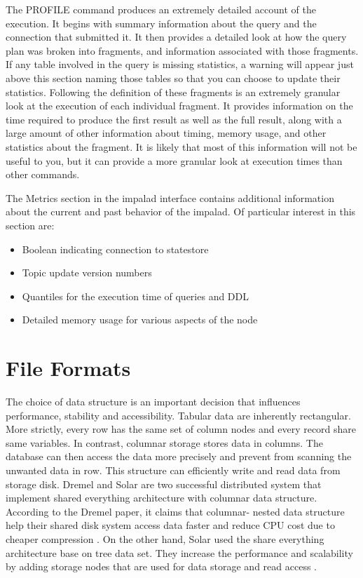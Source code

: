 \documentclass[onecolumn, draftclsnofoot,10pt, compsoc]{IEEEtran}
\begin{document}
The PROFILE command produces an extremely detailed account of the execution.
It begins with summary information about the query and the connection that submitted it.
It then provides a detailed look at how the query plan was broken into fragments, and information associated with those fragments.
If any table involved in the query is missing statistics, a warning will appear just above this section naming those tables so that you can choose to update their statistics.
Following the definition of these fragments is an extremely granular look at the execution of each individual fragment. 
It provides information on the time required to produce the first result as well as the full result, along with a large amount of other information about timing, memory usage, and other statistics about the fragment.
It is likely that most of this information will not be useful to you, but it can provide a more granular look at execution times than other commands. 

The Metrics section in the impalad interface contains additional information about the current and past behavior of the impalad. Of particular interest in this section are: 

\begin{itemize}
    \item Boolean indicating connection to statestore
    \item Topic update version numbers
    \item Quantiles for the execution time of queries and DDL
    \item Detailed memory usage for various aspects of the node
\end{itemize}


\section{File Formats}
The choice of data structure is an important decision that influences performance, stability and accessibility.
Tabular data are inherently rectangular.
More strictly, every row has the same set of column nodes and every record share same variables. 
In contrast, columnar storage stores data in columns. 
The database can then access the data more precisely and prevent from scanning the unwanted data in row. 
This structure can efficiently write and read data from storage disk. 
Dremel and Solar are two successful distributed system that implement shared everything architecture with columnar data structure. 
According to the Dremel paper, it claims that columnar- nested data structure help their shared disk system access data faster and reduce CPU cost due to cheaper compression \cite{Dremel}.
On the other hand, Solar used the share everything architecture base on tree data set. 
They increase the performance and scalability by adding storage nodes that are used for data storage and read access \cite{zhu2018solar}.  
\end{document}

